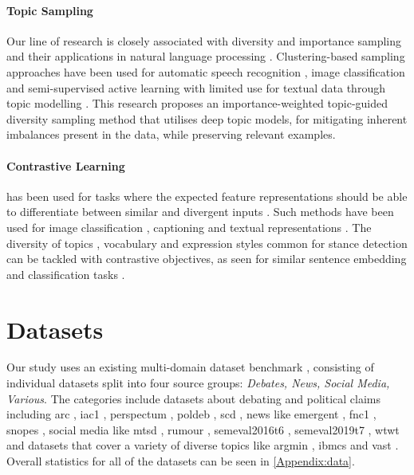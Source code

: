 \documentclass[11pt]{article}
\begin{document}
\paragraph{Topic Sampling}

Our line of research is closely associated with diversity \citep{ren2021survey} and importance \citep{beygelzimer2009importance} sampling and their applications in natural language processing \citep{zhu2008active,zhou2020informed}. Clustering-based sampling approaches have been used for  automatic speech recognition \citep{syed2016supervised}, image classification \citep{ranganathan2017deep,yan2022mitigating} and semi-supervised active learning \citep{buchert2022exploiting} with limited use for textual data \citep{yang2014active} through topic modelling \citep{blei2003latent}. This research proposes an importance-weighted topic-guided diversity sampling method that utilises deep topic models, for mitigating inherent imbalances present in the data, while preserving relevant examples. 


\paragraph{Contrastive Learning}  has been used for tasks where the expected feature representations should be able to differentiate between similar and divergent inputs \citep{liu2021self,10.1145/3561970}. Such methods have been used for image classification \citep{khosla2020supervised}, captioning \citep{dai2017contrastive} and textual representations \citep{giorgi2020declutr,jaiswal2020survey,ostendorff-etal-2022-neighborhood}. The diversity of topics \citep{qazvinian2011rumor,walker2012corpus,hasan2013stance}, vocabulary \citep{somasundaran2010recognizing,wei2019modeling} and expression styles \citep{pomerleau2017fake} common for stance detection can be tackled with contrastive objectives, as seen for similar sentence embedding and classification tasks \citep{gao2021simcse, yan2021consert}. 

\section{Datasets}
\label{sec:datasets}
Our study uses an existing multi-domain dataset benchmark \citep{hardalov2021cross}, consisting of  individual datasets split into four source groups: \textit{Debates, News, Social Media, Various}. The categories include datasets about debating and political claims including arc \citep{hanselowski2018retrospective,habernal2017argument}, iac1 \citep{walker2012corpus}, perspectum \citep{chen2019seeing}, poldeb \citep{somasundaran2010recognizing}, scd \citep{hasan2013stance}, news like emergent \citep{ferreira2016emergent}, fnc1 \citep{pomerleau2017fake}, snopes \citep{hanselowski-etal-2019-richly}, social media like mtsd \cite{sobhani2017dataset}, rumour \citep{qazvinian2011rumor}, semeval2016t6 \citep{mohammad2016semeval}, semeval2019t7 \citep{gorrell2019semeval}, wtwt \citep{conforti2020will} and datasets that cover a variety of diverse topics like argmin \citep{stab-etal-2018-cross}, ibmcs \citep{bar-haim_stance_2017} and vast \citep{allaway-mckeown-2020-zero}. Overall statistics for all of the datasets can be seen in \autoref{Appendix:data}.
\end{document}
